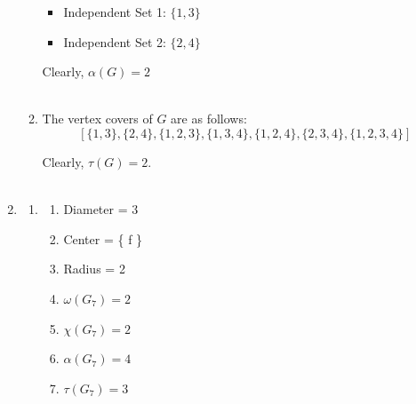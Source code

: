 \documentclass[a4paper]{article}
\begin{document}
\begin{enumerate}
\begin{enumerate}
            \begin{itemize}
                \item Independent Set 1: $\{ 1, 3 \}$
                \item Independent Set 2: $\{ 2, 4 \}$ \\
            \end{itemize}

            Clearly, $\alpha(G) = 2$ \\ \\

            \item The vertex covers of $G$ are as follows: \\
            \[ [\{ 1, 3 \}, \{ 2, 4 \}, \{ 1, 2 , 3 \}, \{ 1, 3, 4 \}, \{ 1, 2, 4 \}, \{ 2, 3, 4 \}, \{ 1, 2, 3, 4 \}] \]

            Clearly, $\tau(G) = 2$. \\ \\
        \end{enumerate}

        \newpage
        \item \begin{enumerate}
            \item \begin{enumerate}[label=(\roman*)]
                \item Diameter = 3
                \item Center = \{ f \}
                \item Radius = 2
                \item $\omega(G_7) = 2$
                \item $\chi(G_7) = 2$
                \item $\alpha(G_7) = 4$
                \item $\tau(G_7) = 3$ \\
            \end{enumerate}


\end{enumerate}
\end{enumerate}
\end{document}
